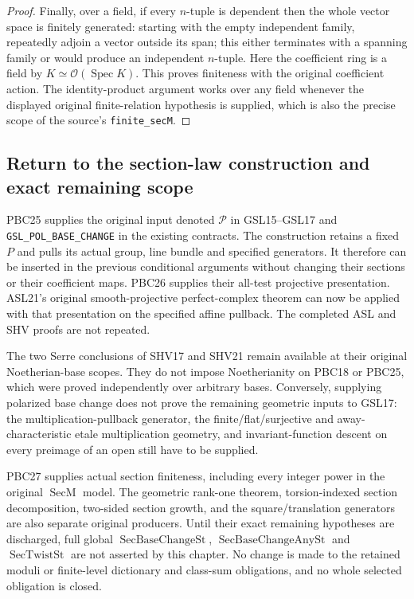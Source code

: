 \documentclass[11pt,a4paper]{article}
\numberwithin{equation}{section}
\theoremstyle{remark}\newtheorem{remark}[theorem]{Remark}
\begin{document}
\begin{proof}
Finally, over a field, if every $n$-tuple is dependent then
the whole vector space is finitely generated: starting with
the empty independent family, repeatedly adjoin a vector
outside its span; this either terminates with a spanning
family or would produce an independent $n$-tuple.
Here the coefficient ring is a field by
$K\simeq\mathcal O(\operatorname{Spec}K)$.
This proves finiteness with the original coefficient action.
The identity-product argument works over any field whenever
the displayed original finite-relation hypothesis is supplied,
which is also the precise scope of the source's
\texttt{finite\_\allowbreak sec\allowbreak M}.
\end{proof}

\subsection{Return to the section-law construction and exact remaining scope}

PBC25 supplies the original input denoted $\mathcal P$ in GSL15--GSL17
and \texttt{GSL\_\allowbreak POL\_\allowbreak BASE\_\allowbreak CHANGE} in the existing contracts.
The construction retains a fixed $P$ and pulls its actual group,
line bundle and specified generators.  It therefore can be inserted
in the previous conditional arguments without changing their sections
or their coefficient maps.
PBC26 supplies their all-test projective presentation.
ASL21's original smooth-projective perfect-complex theorem can now
be applied with that presentation on the specified affine pullback.
The completed ASL and SHV proofs are not repeated.

The two Serre conclusions of SHV17 and SHV21 remain available at their
original Noetherian-base scopes.  They do not impose Noetherianity on
PBC18 or PBC25, which were proved independently over arbitrary bases.
Conversely, supplying polarized base change does not prove the
remaining geometric inputs to GSL17: the multiplication-pullback
generator, the finite/flat/surjective and away-characteristic etale
multiplication geometry, and invariant-function descent on every
preimage of an open still have to be supplied.

PBC27 supplies actual section finiteness, including every integer
power in the original $\operatorname{SecM}$ model.
The geometric rank-one theorem, torsion-indexed section decomposition,
two-sided section growth, and the square/translation generators are also
separate original producers.  Until their exact remaining hypotheses
are discharged, full global
$\operatorname{SecBaseChangeSt}$,
$\operatorname{SecBaseChangeAnySt}$ and
$\operatorname{SecTwistSt}$ are not asserted by this chapter.
No change is made to the retained moduli or finite-level dictionary
and class-sum obligations, and no whole selected obligation is closed.
\end{document}
